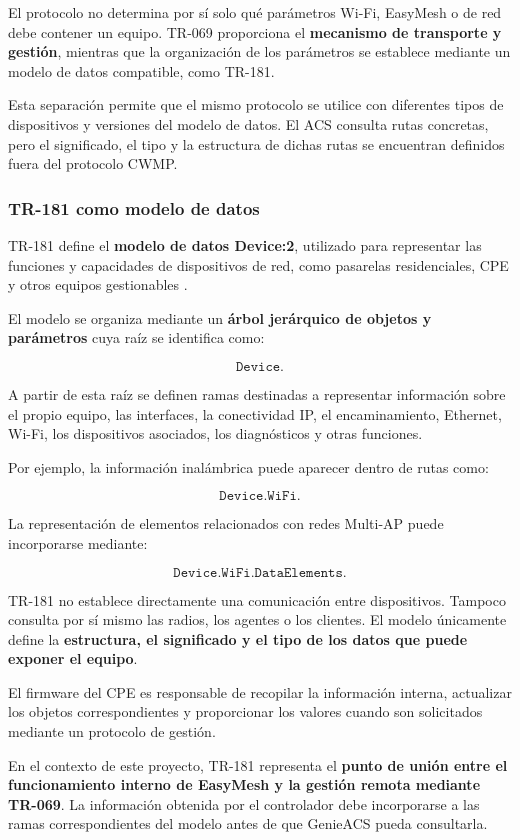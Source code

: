 El protocolo no determina por sí solo qué parámetros Wi-Fi, EasyMesh o
de red debe contener un equipo. TR-069 proporciona el
\textbf{mecanismo de transporte y gestión}, mientras que la organización
de los parámetros se establece mediante un modelo de datos compatible,
como TR-181.

Esta separación permite que el mismo protocolo se utilice con diferentes
tipos de dispositivos y versiones del modelo de datos. El ACS consulta
rutas concretas, pero el significado, el tipo y la estructura de dichas
rutas se encuentran definidos fuera del protocolo CWMP.


\subsubsection*{TR-181 como modelo de datos}

TR-181 define el
\textbf{modelo de datos Device:2}, utilizado para representar las
funciones y capacidades de dispositivos de red, como pasarelas
residenciales, CPE y otros equipos gestionables
\cite{bbf_tr181}.

El modelo se organiza mediante un
\textbf{árbol jerárquico de objetos y parámetros} cuya raíz se identifica
como:

\[
    \texttt{Device.}
\]

A partir de esta raíz se definen ramas destinadas a representar
información sobre el propio equipo, las interfaces, la conectividad IP,
el encaminamiento, Ethernet, Wi-Fi, los dispositivos asociados, los
diagnósticos y otras funciones.

Por ejemplo, la información inalámbrica puede aparecer dentro de rutas
como:

\[
    \texttt{Device.WiFi.}
\]

La representación de elementos relacionados con redes Multi-AP puede
incorporarse mediante:

\[
    \texttt{Device.WiFi.DataElements.}
\]

TR-181 no establece directamente una comunicación entre dispositivos.
Tampoco consulta por sí mismo las radios, los agentes o los clientes. El
modelo únicamente define la \textbf{estructura, el significado y el tipo
de los datos que puede exponer el equipo}.

El firmware del CPE es responsable de recopilar la información interna,
actualizar los objetos correspondientes y proporcionar los valores
cuando son solicitados mediante un protocolo de gestión.

En el contexto de este proyecto, TR-181 representa el
\textbf{punto de unión entre el funcionamiento interno de EasyMesh y la
gestión remota mediante TR-069}. La información obtenida por el
controlador debe incorporarse a las ramas correspondientes del modelo
antes de que GenieACS pueda consultarla.


